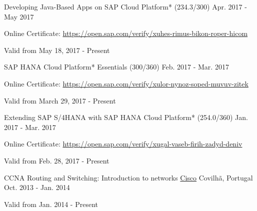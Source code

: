 \begin{cventries}
  \cventry
    {Developing Java-Based Apps on SAP Cloud Platform* (234.3/300)} %
    {} %
    {} %
    {Apr. 2017 - May 2017} %
    {
	    \begin{cvitems} %
        \item[] {Online Certificate: \url{https://open.sap.com/verify/xuhes-rimus-bikon-roper-hicom}} %
        \item[] {Valid from May 18, 2017 - Present} %
      \end{cvitems}
    }    
    \vspace{-0.1cm}
  \cventry
    {SAP HANA Cloud Platform* Essentials (300/360)} %
    {} %
    {} %
    {Feb. 2017 - Mar. 2017} %
    {
	    \begin{cvitems} %
        \item[] {Online Certificate: \url{https://open.sap.com/verify/xulor-nynoz-soped-muvuv-zitek}} %
        \item[] {Valid from March 29, 2017 - Present} %
      \end{cvitems}
    }        
    \vspace{-0.1cm}
  \cventry
    {Extending SAP S/4HANA with SAP HANA Cloud Platform* (254.0/360)} %
    {} %
    {} %
    {Jan. 2017 - Mar. 2017} %
    {
	    \begin{cvitems} %
        \item[] {Online Certificate: \url{https://open.sap.com/verify/xugal-vaseb-firih-zadyd-deniv}} %
        \item[] {Valid from Feb. 28, 2017 - Present} %
      \end{cvitems}
    }
  \cventry
    {CCNA Routing and Switching: Introduction to networks} %
    {\href{https://www.cisco.com/}{Cisco}} %
    {Covilh\~a, Portugal} %
    {Oct. 2013 - Jan. 2014} %
    {
	    \begin{cvitems} %
        \item[] {Valid from Jan. 2014 - Present} %
      \end{cvitems}
    }

\end{cventries}